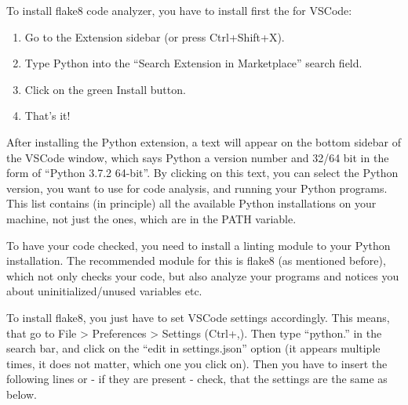 \documentclass[letterpaper,10pt,english]{sphinxmanual}
\begin{document}
To install flake8 code analyzer, you have to install first the  for VSCode:
\begin{enumerate}
%
\item {} 
Go to the Extension sidebar (or press Ctrl+Shift+X).

\item {} 
Type Python into the “Search Extension in Marketplace” search field.

\item {} 
Click on the green Install button.

\item {} 
That’s it!

\end{enumerate}

After installing the Python extension, a text will appear on the bottom sidebar of the VSCode window, which says Python a version number and 32/64 bit in the form of “Python 3.7.2 64-bit”. By clicking on this text, you can select the Python version, you want to use for code analysis, and running your Python programs. This list contains (in principle) all the available Python installations on your machine, not just the ones, which are in the PATH variable.

To have your code checked, you need to install a linting module to your Python installation. The recommended module for this is flake8 (as mentioned before), which not only checks your code, but also analyze your programs and notices you about uninitialized/unused variables etc.

To install flake8, you just have to set VSCode settings accordingly. This means, that go to File \textendash{}\textgreater{} Preferences \textendash{}\textgreater{} Settings (Ctrl+,). Then type “python.” in the search bar, and click on the “edit in settings.json” option (it appears multiple times, it does not matter, which one you click on). Then you have to insert the following lines or - if they are present - check, that the settings are the same as below.

\begin{sphinxVerbatim}[commandchars=\\\{\}]
     
     
     
     \PYG{p}{[}
    \PYG{p}{]}
\end{sphinxVerbatim}
\end{document}
